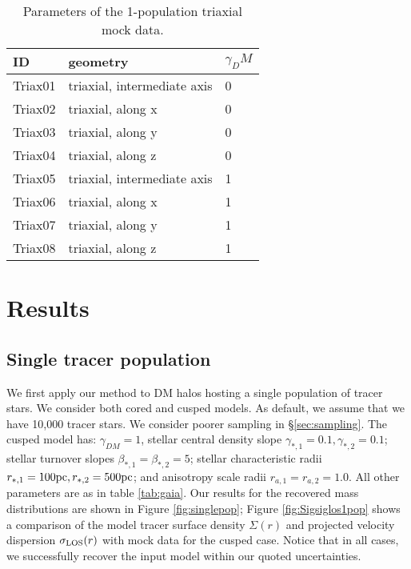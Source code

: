 \begin{table}
    \label{tab:triax}
    \caption{Parameters of the 1-population triaxial mock data.}
    \centering
    \begin{tabular}{lll}
        ID & geometry & $\gamma_DM$\\
        \hline
        Triax01 & triaxial, intermediate axis & 0\\
        Triax02 & triaxial, along x & 0 \\
        Triax03 & triaxial, along y & 0 \\
        Triax04 & triaxial, along z & 0 \\
        Triax05 & triaxial, intermediate axis & 1\\
        Triax06 & triaxial, along x & 1\\
        Triax07 & triaxial, along y & 1\\
        Triax08 & triaxial, along z & 1\\\hline\hline
    \end{tabular}
\end{table}

\section{Results}\label{sec:results}
\subsection{Single tracer population}
We first apply our method to DM halos hosting a single population of
tracer stars. We consider both cored and cusped models. As default, we
assume that we have 10,000 tracer stars. We consider poorer sampling
in \S\ref{sec:sampling}. The cusped model has: $\gamma_{DM}=1$,
stellar central density slope $\gamma_{*,1}=0.1, \gamma_{*,2}=0.1$;
stellar turnover slopes $\beta_{*,1}=\beta_{*,2}=5$; stellar
characteristic radii $r_{*,1}=100\mathrm{pc}, r_{*,2}=500\mathrm{pc}$; and anisotropy
scale radii $r_{a,1}=r_{a,2}=1.0$. All other parameters are as in
table \ref{tab:gaia}. Our results for the recovered mass distributions
are shown in Figure \ref{fig:singlepop}; Figure
\ref{fig:Sigsiglos1pop} shows a comparison of the model tracer surface
density $\Sigma(r)$ and projected velocity dispersion $\sigma_{\text{LOS}}(r)$
with mock data for the cusped case. Notice that in all cases, we
successfully recover the input model within our quoted uncertainties.


